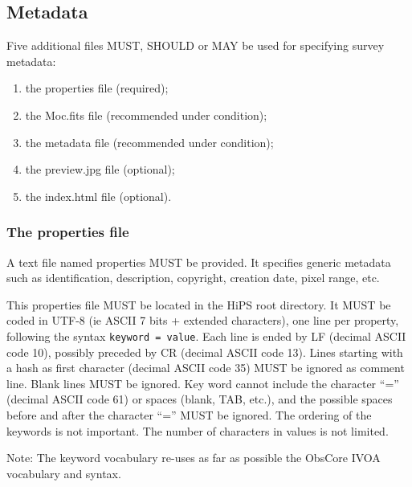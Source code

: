 \documentclass[11pt,a4paper]{ivoa}
\begin{document}
\subsection{Metadata}

Five additional files MUST, SHOULD or MAY be used for specifying survey metadata:
\begin{enumerate}
\item the properties file (required);
\item the Moc.fits file (recommended under condition);
\item the metadata file (recommended under condition);
\item the preview.jpg file (optional);
\item the index.html file (optional).
\end{enumerate}

\subsubsection{The properties file}
\label{sec:properties}

A text file named properties MUST be provided. It specifies generic metadata such as identification, description, copyright, creation date, pixel range, etc.

This properties file MUST be located in the HiPS root directory. It MUST be coded in UTF-8 (ie ASCII 7 bits + extended characters), one line per property, following the syntax \texttt{keyword = value}. Each line is ended by LF (decimal ASCII code 10), possibly preceded by CR (decimal ASCII code 13). Lines starting with a hash as first character (decimal ASCII code 35) MUST be ignored as comment line. Blank lines MUST be ignored. Key word cannot include the character ``='' (decimal ASCII code 61) or spaces (blank, TAB, etc.), and the possible spaces before and after the character ``='' MUST be ignored. The ordering of the keywords is not important. The number of characters in values is not limited.

Note: The keyword vocabulary re-uses as far as possible the ObsCore IVOA vocabulary and syntax. 
\end{document}
